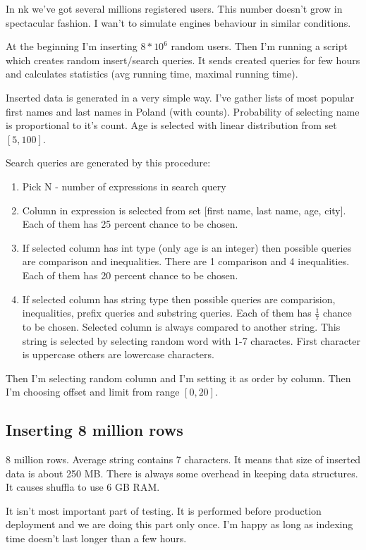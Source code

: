 \documentclass[10pt,a4paper]{article}
\begin{document}
In nk we've got several millions registered users. This number doesn't grow in spectacular fashion. I wan't to simulate engines behaviour in similar conditions. 

At the beginning I'm inserting $8 * 10^6$ random users. Then I'm running a script which creates random insert/search queries. It sends created queries for few hours and calculates statistics (avg running time, maximal running time).

Inserted data is generated in a very simple way. I've gather lists of most popular first names and last names in Poland (with counts). Probability of selecting name is proportional to it's count. Age is selected with linear distribution from set $[5, 100]$.

Search queries are generated by this procedure:
\begin{enumerate}
\item Pick N - number of expressions in search query
\item Column in expression is selected from set [first name, last name, age, city]. Each of them has 25 percent chance to be chosen.
\item If selected column has int type (only age is an integer) then possible queries are comparison and inequalities. There are 1 comparison and 4 inequalities. Each of them has 20 percent chance to be chosen.
\item If selected column has string type then possible queries are comparision, inequalities, prefix queries and substring queries. Each of them has $\frac{1}{7}$ chance to be chosen. Selected column is always compared to another string. This string is selected by selecting random word with 1-7 charactes. First character is uppercase others are lowercase characters. 
\end{enumerate}

Then I'm selecting random column and I'm setting it as order by column. Then I'm choosing offset and limit from range $[0, 20]$.

\subsection{Inserting 8 million rows}

8 million rows. Average string contains 7 characters. It means that size of inserted data is about 250 MB. There is always some overhead in keeping data structures. It causes shuffla to use 6 GB RAM.

It isn't most important part of testing. It is performed before production deployment and we are doing this part only once. I'm happy as long as indexing time doesn't last longer than a few hours. 
\end{document}
